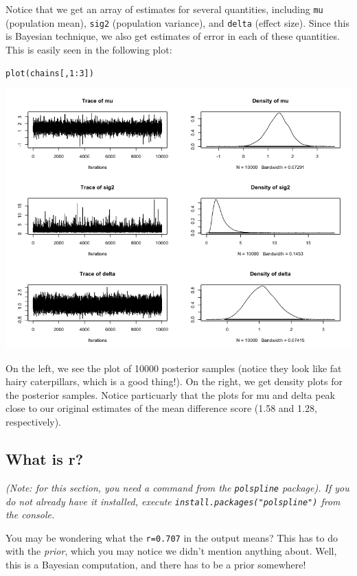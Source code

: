 \documentclass[11pt]{article}
\begin{document}
Notice that we get an array of estimates for several quantities, including \texttt{mu} (population mean), \texttt{sig2} (population variance), and \texttt{delta} (effect size).  Since this is Bayesian technique, we also get estimates of error in each of these quantities.  This is easily seen in the following plot:

\begin{verbatim}
plot(chains[,1:3])
\end{verbatim}

\includegraphics[width=.9\linewidth]{figures/week14/plot1.png}

On the left, we see the plot of 10000 posterior samples (notice they look like fat hairy caterpillars, which is a good thing!).  On the right, we get density plots for the posterior samples. Notice particuarly that the plots for mu and delta peak close to our original estimates of the mean difference score (1.58 and 1.28, respectively).

\subsection*{What is r?}
\label{sec-2-2}

\emph{(Note: for this section, you need a command from the \texttt{polspline} package).  If you do not already have it installed, execute \texttt{install.packages("polspline")} from the console.}

You may be wondering what the \texttt{r=0.707} in the output means?  This has to do with the \emph{prior}, which you may notice we didn't mention anything about.  Well, this is a Bayesian computation, and there has to be a prior somewhere!
\end{document}
